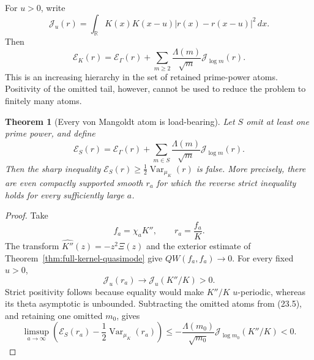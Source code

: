 \documentclass[11pt]{amsart}
\newtheorem{theorem}{Theorem}[section]
\theoremstyle{definition}
\theoremstyle{remark}
\begin{document}
For \(u>0\), write
\[
 \mathcal J_u(r)
 =\int_\mathbb R K(x)K(x-u)
 |r(x)-r(x-u)|^2\,dx.
\tag{24.1}
\]
Then
\[
 \mathscr E_K(r)
 =\mathscr E_\Gamma(r)
  +\sum_{m\ge2}\frac{\Lambda(m)}{\sqrt m}
       \mathcal J_{\log m}(r).
\tag{24.2}
\]
This is an increasing hierarchy in the set of retained prime-power atoms.
Positivity of the omitted tail, however, cannot be used to reduce the
problem to finitely many atoms.

\begin{theorem}[Every von Mangoldt atom is load-bearing]
\label{thm:atomwise-load}
Let \(S\) omit at least one prime power, and define
\[
 \mathscr E_S(r)
 =\mathscr E_\Gamma(r)
  +\sum_{m\in S}\frac{\Lambda(m)}{\sqrt m}
       \mathcal J_{\log m}(r).
\tag{24.3}
\]
Then the sharp inequality
\(\mathscr E_S(r)\ge\tfrac12\operatorname{Var}_{\mu_K}(r)\)
is false.  More precisely, there are even compactly supported smooth
\(r_a\) for which the reverse strict inequality holds for every
sufficiently large \(a\).
\end{theorem}

\begin{proof}
Take
\[
 f_a=\chi_aK'',\qquad
 r_a=\frac{f_a}{K}.
\tag{24.4}
\]
The transform \(\widehat{K''}(z)=-z^2\Xi(z)\) and the exterior estimate
of Theorem~\ref{thm:full-kernel-quasimode} give
\(QW(f_a,f_a)\to0\).  For every fixed \(u>0\),
\[
 \mathcal J_u(r_a)\longrightarrow
 \mathcal J_u(K''/K)>0.
\tag{24.5}
\]
Strict positivity follows because equality would make \(K''/K\)
\(u\)-periodic, whereas its theta asymptotic is unbounded.  Subtracting the
omitted atoms from (23.5), and retaining one omitted \(m_0\), gives
\[
 \limsup_{a\to\infty}
 \left(
 \mathscr E_S(r_a)-\frac12\operatorname{Var}_{\mu_K}(r_a)
 \right)
 \le
 -\frac{\Lambda(m_0)}{\sqrt{m_0}}
 \mathcal J_{\log m_0}(K''/K)<0.
\tag{24.6}
\]
\end{proof}
\end{document}
